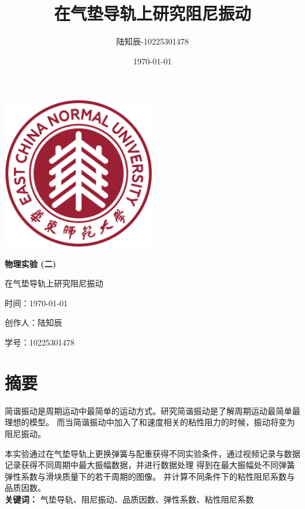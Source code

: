 \documentclass{ctexart}
\title{在气垫导轨上研究阻尼振动}
\author{陆知辰-10225301478}
\date{\today}
\begin{document}
\begin{titlepage}
  \centering
  \includegraphics[width=0.5\textwidth]{ecnu.png}
  
  \vspace*{\baselineskip}
  
  \Huge\textbf{物\quad 理\quad 实\quad 验 \quad (二)}
  \vspace*{0.3\baselineskip}
  
  \huge 在气垫导轨上研究阻尼振动
  
  \vspace*{2\baselineskip}
  
  \large 时间：\today
  
  \vspace*{\baselineskip}
  
  \large 创作人：陆知辰
  
  \vspace*{\baselineskip}
  
  \large 学号：10225301478
  
\end{titlepage}
\newpage
\tableofcontents
\newpage
\section{摘要}
简谐振动是周期运动中最简单的运动方式。研究简谐振动是了解周期运动最简单最理想的模型。
而当简谐振动中加入了和速度相关的粘性阻力的时候，振动将变为阻尼振动。

本实验通过在气垫导轨上更换弹簧与配重获得不同实验条件，通过视频记录与数据记录获得不同周期中最大振幅数据，并进行数据处理
得到在最大振幅处不同弹簧弹性系数与滑块质量下的若干周期的图像。
并计算不同条件下的粘性阻尼系数与品质因数。\\
\newline
\textbf{关键词：} \quad 气垫导轨、阻尼振动、品质因数、弹性系数、粘性阻尼系数
\end{document}
